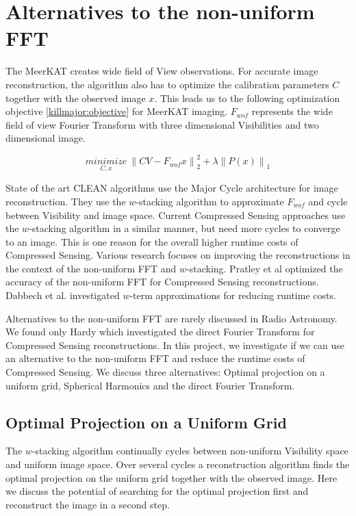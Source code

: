 \section{Alternatives to the non-uniform FFT}\label{killmajor}
The MeerKAT creates wide field of View observations. For accurate image reconstruction, the algorithm also has to optimize the calibration parameters $C$ together with the observed image $x$. This leads us to the following optimization objective \eqref{killmajor:objective} for MeerKAT imaging. $F_{wof}$ represents the wide field of view Fourier Transform with three dimensional Visibilities and two dimensional image. 

\begin{equation}\label{killmajor:objective}
\underset{C, x}{minimize} \: \left \| CV - F_{wof}x \right \|_2^2 + \lambda \left \| P(x) \right \|_1
\end{equation}

State of the art CLEAN algorithms use the Major Cycle architecture for image reconstruction. They use the $w$-stacking algorithm to approximate $F_{wof}$ and cycle between Visibility and image space. Current Compressed Sensing approaches use the $w$-stacking algorithm in a similar manner\cite{girard2015sparse, dabbech2018cygnus, mcewen2011compressed, pratley2018fast}, but need more cycles to converge to an image. This is one reason for the overall higher runtime costs of Compressed Sensing. Various research focuses on improving the reconstructions in the context of the non-uniform FFT and $w$-stacking. Pratley et al\cite{pratley2017robust} optimized the accuracy of the non-uniform FFT for Compressed Sensing reconstructions. Dabbech et al.\cite{dabbech2017wEffect} investigated $w$-term approximations for reducing runtime costs. 

Alternatives to the non-uniform FFT are rarely discussed in Radio Astronomy. We found only Hardy\cite{hardy2013direct} which investigated the direct Fourier Transform for Compressed Sensing reconstructions. In this project, we investigate if we can use an alternative to the non-uniform FFT and reduce the runtime costs of Compressed Sensing. We discuss three alternatives: Optimal projection on a uniform grid, Spherical Harmonics and the direct Fourier Transform.

\subsection{Optimal Projection on a Uniform Grid}
The $w$-stacking algorithm continually cycles between non-uniform Visibility space and uniform image space. Over several cycles a reconstruction algorithm finds the optimal projection on the uniform grid together with the observed image. Here we discuss the potential of searching for the optimal projection first and reconstruct the image in a second step.

